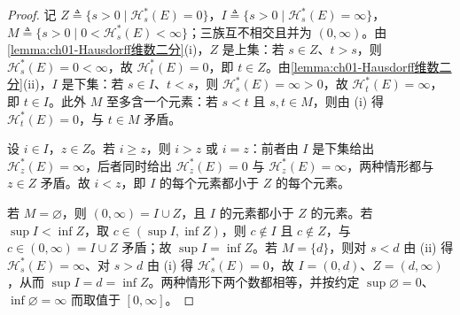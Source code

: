 \documentclass[../../main.tex]{subfiles}%
\begin{document}
\begin{proof}
记 $Z\triangleq\{s>0\mid\mathcal{H}_s^*(E)=0\}$，$I\triangleq\{s>0\mid\mathcal{H}_s^*(E)=\infty\}$，$M\triangleq\{s>0\mid0<\mathcal{H}_s^*(E)<\infty\}$；三族互不相交且并为 $(0,\infty)$。由\cref{lemma:ch01-Hausdorff维数二分}(i)，$Z$ 是上集：若 $s\in Z$、$t>s$，则 $\mathcal{H}_s^*(E)=0<\infty$，故 $\mathcal{H}_t^*(E)=0$，即 $t\in Z$。由\cref{lemma:ch01-Hausdorff维数二分}(ii)，$I$ 是下集：若 $s\in I$、$t<s$，则 $\mathcal{H}_s^*(E)=\infty>0$，故 $\mathcal{H}_t^*(E)=\infty$，即 $t\in I$。此外 $M$ 至多含一个元素：若 $s<t$ 且 $s,t\in M$，则由 (i) 得 $\mathcal{H}_t^*(E)=0$，与 $t\in M$ 矛盾。

设 $i\in I$，$z\in Z$。若 $i\geqslant z$，则 $i>z$ 或 $i=z$：前者由 $I$ 是下集给出 $\mathcal{H}_z^*(E)=\infty$，后者同时给出 $\mathcal{H}_z^*(E)=0$ 与 $\mathcal{H}_z^*(E)=\infty$，两种情形都与 $z\in Z$ 矛盾。故 $i<z$，即 $I$ 的每个元素都小于 $Z$ 的每个元素。

若 $M=\varnothing$，则 $(0,\infty)=I\cup Z$，且 $I$ 的元素都小于 $Z$ 的元素。若 $\sup I<\inf Z$，取 $c\in(\sup I,\inf Z)$，则 $c\notin I$ 且 $c\notin Z$，与 $c\in(0,\infty)=I\cup Z$ 矛盾；故 $\sup I=\inf Z$。若 $M=\{d\}$，则对 $s<d$ 由 (ii) 得 $\mathcal{H}_s^*(E)=\infty$、对 $s>d$ 由 (i) 得 $\mathcal{H}_s^*(E)=0$，故 $I=(0,d)$、$Z=(d,\infty)$，从而 $\sup I=d=\inf Z$。两种情形下两个数都相等，并按约定 $\sup\varnothing=0$、$\inf\varnothing=\infty$ 而取值于 $[0,\infty]$。
\end{proof}
\end{document}
